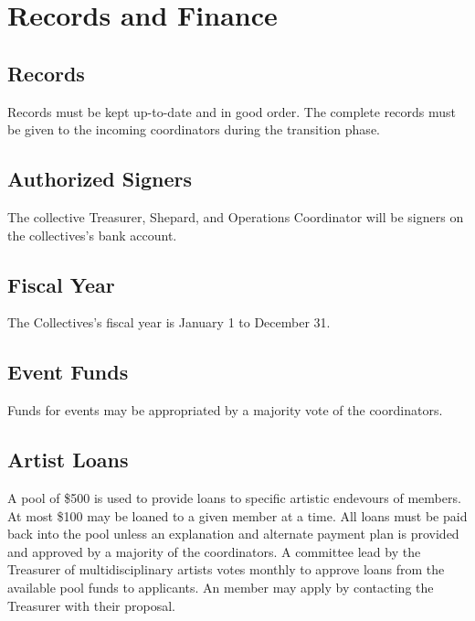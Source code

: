 \chapter{Records and Finance}

\section{Records}\label{sec:records}
Records must be kept up-to-date and in good order. The complete records must be given to the incoming coordinators during the transition phase.

\section{Authorized Signers}\label{sec:authorized_signers}
The collective Treasurer, Shepard, and Operations Coordinator will be signers on the collectives's bank account.

\section{Fiscal Year}\label{sec:fiscal_year}
The Collectives's fiscal year is January 1 to December 31.

\section{Event Funds}\label{sec:event_funds}
Funds for events may be appropriated by a majority vote of the coordinators.

\section{Artist Loans}\label{sec:artist_loans}
A pool of \$500 is used to provide loans to specific artistic endevours of members. At most \$100 may be loaned to a given member at a time. All loans must be paid back into the pool unless an explanation and alternate payment plan is provided and approved by a majority of the coordinators. A committee lead by the Treasurer of multidisciplinary artists votes monthly to approve loans from the available pool funds to applicants. An member may apply by contacting the Treasurer with their proposal.
